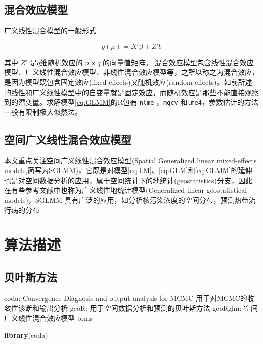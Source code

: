\documentclass[]{article}
\newenvironment{Shaded}{\begin{snugshade}}{\end{snugshade}}
\newcommand{\KeywordTok}[1]{\textcolor[rgb]{0.13,0.29,0.53}{\textbf{#1}}}
\newcommand{\NormalTok}[1]{#1}
\begin{document}
\subsection{混合效应模型}

广义线性混合模型的一般形式

\begin{equation}
g(\mu) = X'\beta + Z'b  \label{eq:GLMM}
\end{equation}

其中 \(Z'\) 是\(q\)维随机效应的 \(n \times q\) 的向量值矩阵。
混合效应模型包含线性混合效应模型、广义线性混合效应模型、非线性混合效应模型等，之所以称之为混合效应，是因为模型既包含固定效应(fixed-effects)又随机效应(random
effects)。如前所述的线性和广义线性模型中的自变量就是固定效应，而随机效应是那些不能直接观察到的潜变量。求解模型\eqref{eq:GLMM}的R包有
\texttt{nlme} \citep{R-nlme}，\texttt{mgcv} \citep{mgcv2017}
和\texttt{lme4}\citep{lme4JSS}，参数估计的方法一般有限制极大似然法。

\subsection{空间广义线性混合效应模型}

本文重点关注空间广义线性混合效应模型(Spatial Generalized linear
mixed-effects
models,简写为SGLMM)\citep{Zhang2002On, Varin2005Pairwise, Bonat2016Practical}，它既是对模型\eqref{eq:LM}、\eqref{eq:GLM}和\eqref{eq:GLMM}的延伸也是对空间数据分析的应用，属于空间统计下的地统计(geostatistics)分支，因此在有些参考文献\citep{Diggle2002, Christensen2004, Diggle2007}中也称为广义线性地统计模型(Generalized
linear geostatistical models)，SGLMM
具有广泛的应用，如分析核污染浓度的空间分布\citep{Diggle1998}，预测热带流行病的分布\citep{Diggle2016}

\section{算法描述}

\subsection{贝叶斯方法}

coda: Convergence Diagnosis and output analysis for MCMC
用于对MCMC的收敛性诊断和输出分析 \citep{coda2006} geoR:
用于空间数据分析和预测的贝叶斯方法 \citep{geoR2001} geoRglm:
空间广义线性混合效应模型 \citep{geoRglm2002} brms \citep{brms2017JSS}

\begin{Shaded}
\begin{Highlighting}[]
\KeywordTok{library}\NormalTok{(coda)}
\end{Highlighting}
\end{Shaded}
\end{document}
